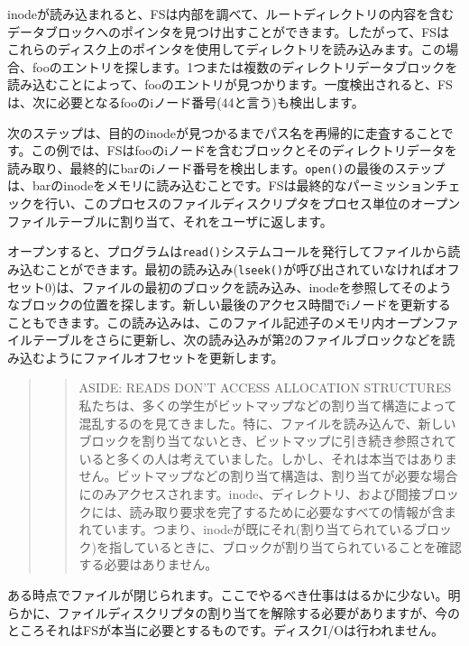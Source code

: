 inodeが読み込まれると、FSは内部を調べて、ルートディレクトリの内容を含むデータブロックへのポインタを見つけ出すことができます。したがって、FSはこれらのディスク上のポインタを使用してディレクトリを読み込みます。この場合、fooのエントリを探します。1つまたは複数のディレクトリデータブロックを読み込むことによって、fooのエントリが見つかります。一度検出されると、FSは、次に必要となるfooのiノード番号(44と言う)も検出します。

次のステップは、目的のinodeが見つかるまでパス名を再帰的に走査することです。この例では、FSはfooのiノードを含むブロックとそのディレクトリデータを読み取り、最終的にbarのiノード番号を検出します。\texttt{open()}の最後のステップは、barのinodeをメモリに読み込むことです。FSは最終的なパーミッションチェックを行い、このプロセスのファイルディスクリプタをプロセス単位のオープンファイルテーブルに割り当て、それをユーザに返します。

オープンすると、プログラムは\texttt{read()}システムコールを発行してファイルから読み込むことができます。最初の読み込み(\texttt{lseek()}が呼び出されていなければオフセット0)は、ファイルの最初のブロックを読み込み、inodeを参照してそのようなブロックの位置を探します。新しい最後のアクセス時間でiノードを更新することもできます。この読み込みは、このファイル記述子のメモリ内オープンファイルテーブルをさらに更新し、次の読み込みが第2のファイルブロックなどを読み込むようにファイルオフセットを更新します。

\begin{quote}
\begin{quote}
ASIDE: READS DON'T ACCESS ALLOCATION STRUCTURES\\
私たちは、多くの学生がビットマップなどの割り当て構造によって混乱するのを見てきました。特に、ファイルを読み込んで、新しいブロックを割り当てないとき、ビットマップに引き続き参照されていると多くの人は考えていました。しかし、それは本当ではありません。ビットマップなどの割り当て構造は、割り当てが必要な場合にのみアクセスされます。inode、ディレクトリ、および間接ブロックには、読み取り要求を完了するために必要なすべての情報が含まれています。つまり、inodeが既にそれ(割り当てられているブロック)を指しているときに、ブロックが割り当てられていることを確認する必要はありません。
\end{quote}
\end{quote}

ある時点でファイルが閉じられます。ここでやるべき仕事ははるかに少ない。明らかに、ファイルディスクリプタの割り当てを解除する必要がありますが、今のところそれはFSが本当に必要とするものです。ディスクI/Oは行われません。

